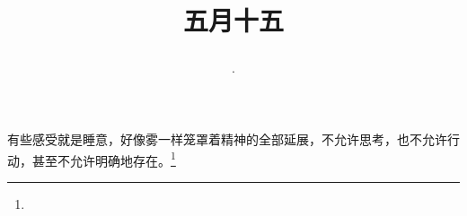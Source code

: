 \title{\date[d=20,m=6,y=2024][year:cn-y,年,month:cn,day:cn,日,·,weekday]·五月十五 }
有些感受就是睡意，好像雾一样笼罩着精神的全部延展，不允许思考，也不允许行动，甚至不允许明确地存在。\footnote{ }

